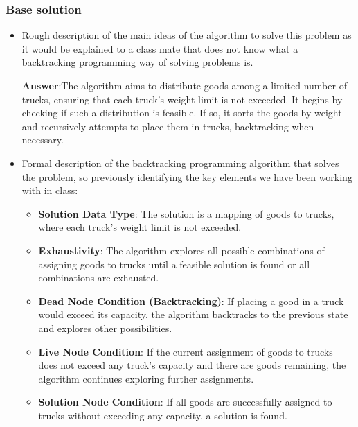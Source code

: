 \documentclass{article}
\begin{document}
\subsubsection{Base solution}
\begin{itemize}
	\item Rough description of the main ideas of the algorithm to solve this problem as it would
	      be explained to a class mate that does not know what a backtracking programming way of solving problems is.

	      \textbf{Answer}:\quad The algorithm aims to distribute goods among a limited number of trucks, ensuring
	      that each truck's weight limit is not exceeded. It begins by checking if such a distribution is feasible.
	      If so, it sorts the goods by weight and recursively attempts to place them in trucks, backtracking when necessary.

	\item Formal description of the backtracking programming algorithm that solves the problem, so previously
	      identifying the key elements we have been working with in class:
	      \begin{itemize}
		      \item \textbf{Solution Data Type}: The solution is a mapping of goods to trucks, where each truck's weight limit
		            is not exceeded.
		      \item \textbf{Exhaustivity}: The algorithm explores all possible combinations of assigning goods to trucks until
		            a feasible solution is found or all combinations are exhausted.
		      \item \textbf{Dead Node Condition (Backtracking)}: If placing a good in a truck would exceed its capacity, the
		            algorithm backtracks to the previous state and explores other possibilities.
		      \item \textbf{Live Node Condition}: If the current assignment of goods to trucks does not exceed any truck's
		            capacity and there are goods remaining, the algorithm continues exploring further assignments.
		      \item \textbf{Solution Node Condition}: If all goods are successfully assigned to trucks without exceeding
		            any capacity, a solution is found.
	      \end{itemize}
\end{itemize}
\end{document}
